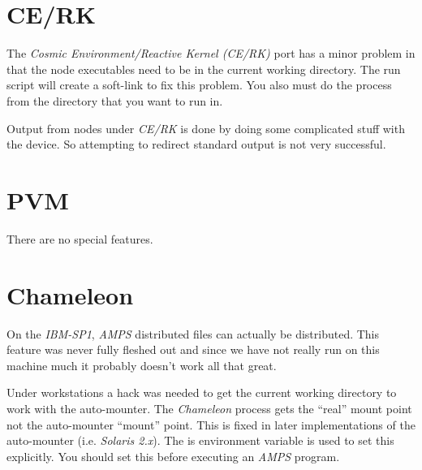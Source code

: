 
\section{CE/RK}
\label{CE/RK}

The {\em Cosmic Environment/Reactive Kernel (CE/RK)} port has a minor
problem in that the node executables need to be in the current working
directory.  The \parflow{} run script will create a soft-link to fix
this problem.  You also must do the  process from the
directory that you want to run in.

Output from nodes under {\em CE/RK} is done by doing some complicated
stuff with the  device.  So attempting to redirect standard
output is not very successful.


\section{PVM}
\label{PVM}

There are no special features.


\section{Chameleon}
\label{Chameleon}

On the {\em IBM-SP1}, {\em AMPS} distributed files can actually be
distributed.  This feature was never fully fleshed out and since we
have not really run on this machine much it probably doesn't work all
that great.

Under workstations a hack was needed to get the current working
directory to work with the auto-mounter.  The {\em Chameleon} process
gets the ``real'' mount point not the auto-mounter ``mount'' point.
This is fixed in later implementations of the auto-mounter (i.e. {\em
Solaris 2.x}).  The  is environment variable is
used to set this explicitly.  You should set this before executing an
{\em AMPS} program.


